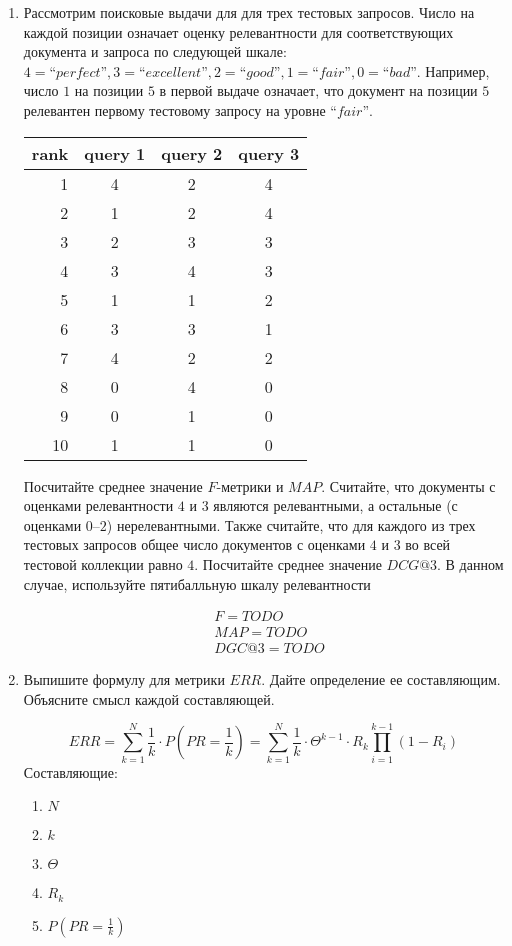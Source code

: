 \begin{enumerate}
	\item Рассмотрим поисковые выдачи для для трех тестовых запросов. Число на каждой позиции 
	означает оценку релевантности для соответствующих документа и запроса по следующей шкале: 
	$4 = “perfect”, 3 = “excellent”, 2 = “good”, 1 = “fair”, 0 = “bad”$. Например, число $1$ 
	на позиции $5$ в первой выдаче означает, что документ на позиции $5$ релевантен первому 
	тестовому запросу на уровне $“fair”$.
	
	\begin{tabular}{ r | c | c | c }
		rank & query 1 & query 2 & query 3 \\
		\hline
		1 & 4 & 2 & 4  \\
		2 & 1 & 2 & 4  \\
		3 & 2 & 3 & 3  \\
		4 & 3 & 4 & 3  \\
		5 & 1 & 1 & 2  \\
		6 & 3 & 3 & 1  \\
		7 & 4 & 2 & 2  \\
		8 & 0 & 4 & 0  \\
		9 & 0 & 1 & 0  \\
		10 & 1 & 1 & 0 \\
	\end{tabular}
	
	Посчитайте среднее значение $F$-метрики и $MAP$. Считайте, что документы с оценками 
	релевантности $4$ и $3$ являются релевантными, а остальные (с оценками $0–2$)	
	нерелевантными. Также считайте, что для каждого из трех тестовых запросов общее число 
	документов с оценками $4$ и $3$ во всей тестовой коллекции равно $4$. Посчитайте среднее 
	значение $DCG@3$. В данном случае, используйте пятибалльную шкалу релевантности
	
	\begin{align*}
		&F = TODO \\
		&MAP = TODO \\
		&DGC@3 = TODO
	\end{align*}
	
	\item Выпишите формулу для метрики $ERR$. Дайте определение ее составляющим. Объясните 
	смысл каждой составляющей.
	
	\begin{equation*}
		ERR = \sum\limits_{k = 1}^{N}\frac{1}{k}\cdot P(PR = \frac{1}{k}) = 
		\sum\limits_{k = 1}^{N}\frac{1}{k}\cdot \varTheta^{k - 1}\cdot R_k \prod\limits_{i = 1}^ {k - 1}(1 - R_i) 
	\end{equation*}
	Составляющие:
	\begin{enumerate}
		\item $N$  
		\item $k$
		\item $\varTheta$
		\item $R_k$
		\item $P(PR = \frac{1}{k})$
	\end{enumerate}


\end{enumerate}
